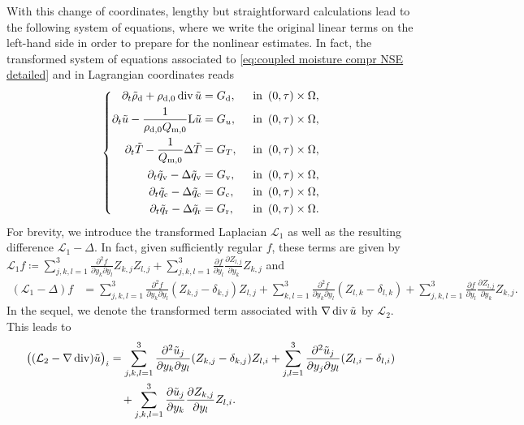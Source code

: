 \documentclass[10pt]{amsart}
\theoremstyle{plain}
\theoremstyle{definition}
\theoremstyle{thm}
\numberwithin{equation}{section}
\newcommand{\rL}{\mathrm{L}}
\newcommand{\cL}{\mathcal{L}}
\DeclareMathOperator{\mdiv}{div}
\newcommand{\del}{\partial}
\newcommand{\tin}{\enspace \text{in} \enspace}
\newcommand{\rd}{\mathrm{d}}
\renewcommand{\rm}{\mathrm{m}}
\newcommand{\rr}{\mathrm{r}}
\newcommand{\rv}{\mathrm{v}}
\newcommand{\rc}{\mathrm{c}}
\newcommand{\trho}{\Tilde{\rho}}
\newcommand{\tu}{\Tilde{u}}
\newcommand{\tT}{\Tilde{T}}
\newcommand{\tq}{\Tilde{q}}
\begin{document}
With this change of coordinates, lengthy but straightforward calculations lead to the following system of equations, where we write the original linear terms on the left-hand side in order to prepare for the nonlinear estimates.
In fact, the transformed system of equations associated to \eqref{eq:coupled moisture compr NSE detailed} and in Lagrangian coordinates reads
\begin{equation}\label{eq:Lagrangian coords}
	\left\{	
    \begin{aligned}
        \del_t\trho_\rd+\rho_{\rd,0}\mdiv\tu
        &=G_\rd, &&\tin (0,\tau) \times \Omega,\\
		\del_t\tu-\frac{1}{\rho_{\rd,0}Q_{\rm,0}}\rL\tu 
        &=G_u, &&\tin (0,\tau) \times \Omega,\\
        \del_t\tT-\frac{1}{Q_{\rm,0}}\Delta\tT
        &=G_T, &&\tin (0,\tau) \times \Omega,\\
        \del_t\tq_\rv-\Delta\tq_\rv
        &=G_\rv, &&\tin (0,\tau) \times \Omega,\\
        \del_t\tq_\rc-\Delta\tq_\rc
        &=G_\rc, &&\tin (0,\tau) \times \Omega,\\
        \del_t\tq_\rr-\Delta \tq_\rr
        &=G_\rr, &&\tin (0,\tau) \times \Omega.
		\end{aligned}\right.
\end{equation}
For brevity, we introduce the transformed Laplacian $\cL_1$ as well as the resulting difference $\cL_1 - \Delta$.
In fact, given sufficiently regular $f$, these terms are given by~$\cL_1 f \coloneqq \sum_{j,k,l=1}^3 \frac{\del^2 f}{\del y_k \del y_l} Z_{k,j} Z_{l,j} + \sum_{j,k,l=1}^3 \frac{\del f}{\del y_l} \frac{\del Z_{l,j}}{\del y_k} Z_{k,j}$ and
\begin{equation}\label{eq:transformed Laplacian minus Laplacian}
    \begin{aligned}
        (\cL_1 - \Delta) f 
        &= \sum_{j,k,l=1}^3\frac{\partial^{2}f}{\partial{y_{k}}\partial{y_{l}}}(Z_{k,j}-\delta_{k,j})Z_{l,j} + \sum_{k,l=1}^3\frac{\partial^{2}f}{\partial{y_{k}}\partial{y_{l}}}(Z_{l,k}-\delta_{l,k}) + \sum_{j,k,l=1}^3\frac{\partial f}{\partial{y_{l}}} \frac{\partial Z_{l,j}}{\partial{y_{k}}}Z_{k,j}.
    \end{aligned}
\end{equation}
In the sequel, we denote the transformed term associated with $\nabla \mdiv \tu$ by $\cL_2$.
This leads to
\begin{equation}\label{eq:transformed second comp Lame}
    \begin{aligned}
        \bigl((\cL_2 - \nabla \mdiv) \tu\bigr)_i 
        &= \sum_{j,k,l=1}^3\frac{\partial^{2}\tu_{j}}{\partial{y_{k}}\partial{y_{l}}}(Z_{k,j}-\delta_{k,j})Z_{l,i} + \sum_{j,l=1}^3\frac{\partial^{2}\tu_{j}}{\partial{y_{j}}\partial{y_{l}}}(Z_{l,i}-\delta_{l,i})\\
        &\quad + \sum_{j,k,l=1}^3\frac{\partial\tu_{j}}{\partial{y_{k}}} \frac{\partial Z_{k,j}}{\partial{y_{l}}}Z_{l,i}.
    \end{aligned}
\end{equation}
\end{document}
